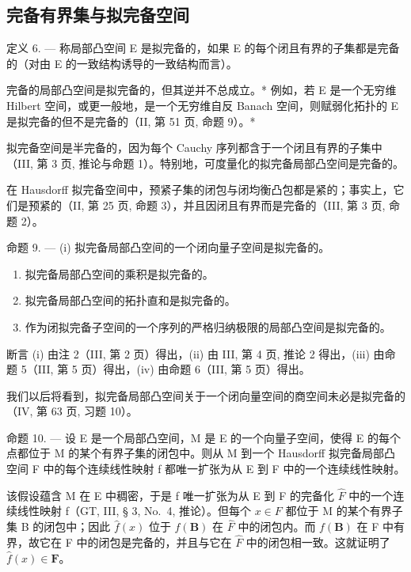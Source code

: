 \subsection{完备有界集与拟完备空间}

定义 6. --- 称局部凸空间 E 是拟完备的，如果 E 的每个闭且有界的子集都是完备的（对由 E 的一致结构诱导的一致结构而言）。

完备的局部凸空间是拟完备的，但其逆并不总成立。* 例如，若 E 是一个无穷维 Hilbert 空间，或更一般地，是一个无穷维自反 Banach 空间，则赋弱化拓扑的 E 是拟完备的但不是完备的（II, 第 51 页, 命题 9）。*

拟完备空间是半完备的，因为每个 Cauchy 序列都含于一个闭且有界的子集中（III, 第 3 页, 推论与命题 1）。特别地，可度量化的拟完备局部凸空间是完备的。

在 Hausdorff 拟完备空间中，预紧子集的闭包与闭均衡凸包都是紧的；事实上，它们是预紧的（II, 第 25 页, 命题 3），并且因闭且有界而是完备的（III, 第 3 页, 命题 2）。

命题 9. --- (i) 拟完备局部凸空间的一个闭向量子空间是拟完备的。

\begin{enumerate}
\def\labelenumi{(\roman{enumi})}
\setcounter{enumi}{1}
\item
  拟完备局部凸空间的乘积是拟完备的。
\item
  拟完备局部凸空间的拓扑直和是拟完备的。
\item
  作为闭拟完备子空间的一个序列的严格归纳极限的局部凸空间是拟完备的。
\end{enumerate}

断言 (i) 由注 2（III, 第 2 页）得出，(ii) 由 III, 第 4 页, 推论 2 得出，(iii) 由命题 5（III, 第 5 页）得出，(iv) 由命题 6（III, 第 5 页）得出。

我们以后将看到，拟完备局部凸空间关于一个闭向量空间的商空间未必是拟完备的（IV, 第 63 页, 习题 10）。

命题 10. --- 设 E 是一个局部凸空间，M 是 E 的一个向量子空间，使得 E 的每个点都位于 M 的某个有界子集的闭包中。则从 M 到一个 Hausdorff 拟完备局部凸空间 F 中的每个连续线性映射 f 都唯一扩张为从 E 到 F 中的一个连续线性映射。

该假设蕴含 M 在 E 中稠密，于是 f 唯一扩张为从 E 到 F 的完备化 \(\hat{F}\) 中的一个连续线性映射 f（GT, III, § 3, No.~4, 推论）。但每个 \(x \in F\) 都位于 M 的某个有界子集 B 的闭包中；因此 \(\hat{f}(x)\) 位于 \(f(\mathbf{B})\) 在 \(\hat{F}\) 中的闭包内。而 \(f(\mathbf{B})\) 在 F 中有界，故它在 F 中的闭包是完备的，并且与它在 \(\hat{F}\) 中的闭包相一致。这就证明了 \(\hat{f}(x) \in \mathbf{F}\)。

